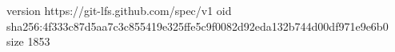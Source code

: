 version https://git-lfs.github.com/spec/v1
oid sha256:4f333c87d5aa7c3c855419e325ffe5c9f0082d92eda132b744d00df971e9e6b0
size 1853
